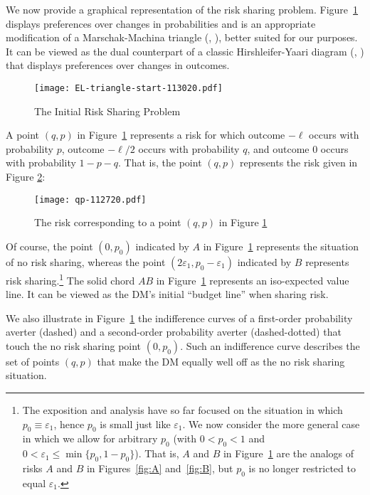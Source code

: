 \documentclass[11pt]{article}
\begin{document}
We now provide a graphical representation of the risk sharing problem. 
Figure~\ref{fig:initial-EL-triangle} displays preferences over changes in probabilities
and is an appropriate modification of a Marschak-Machina triangle (\cite{M50}, \cite{M82}),
better suited for our purposes. 
It can be viewed as the dual counterpart of a classic Hirshleifer-Yaari diagram (\cite{H65,H66}, \cite{Y65,Y69})
that displays preferences over changes in outcomes.
\vskip -0.5cm
\begin{figure}[H]
\begin{center}
\caption{The Initial Risk Sharing Problem
}
\vskip 0.37cm
\texttt{[image: EL-triangle-start-113020.pdf]}
\label{fig:initial-EL-triangle}
\end{center}
\end{figure}
A point $(q,p)$ in Figure~\ref{fig:initial-EL-triangle} represents a risk
for which outcome $-\ell$ occurs with probability $p$,
outcome $-\ell/2$ occurs with probability $q$,
and 
outcome $0$ occurs with probability $1-p-q$.
That is, the point $(q,p)$ represents the risk given in Figure \ref{fig:qp}:
\vskip -0.5cm
\begin{figure}[H]
\begin{center}
\caption{The risk corresponding to a point $(q,p)$ in Figure \ref{fig:initial-EL-triangle}
}
\vskip 0.4cm
\texttt{[image: qp-112720.pdf]}
\label{fig:qp}
\end{center}
\end{figure}
\noindent
Of course, the point $(0,p_{0})$ indicated by $A$ in Figure~\ref{fig:initial-EL-triangle} represents the situation of no risk sharing,
whereas the point $(2\varepsilon_{1},p_{0}-\varepsilon_{1})$ indicated by $B$ represents %
risk sharing.\footnote{The exposition and analysis have so far focused on the situation in which $p_{0}\equiv\varepsilon_{1}$,
hence $p_{0}$ is small just like $\varepsilon_{1}$.
We now consider the more general case in which
we allow for arbitrary $p_{0}$ (with $0<p_{0}<1$ and $0<\varepsilon_{1}\leq \min\{p_{0},1-p_{0}\}$).
That is, $A$ and $B$ in Figure~\ref{fig:initial-EL-triangle} are the analogs of risks $A$ and $B$ in Figures~\ref{fig:A} and~\ref{fig:B},
but $p_{0}$ is no longer restricted to equal $\varepsilon_{1}$.}
The solid chord $AB$ in Figure~\ref{fig:initial-EL-triangle} represents an iso-expected value line. 
It can be viewed as the DM's initial ``budget line'' when sharing risk.

We also illustrate 
in Figure~\ref{fig:initial-EL-triangle}
the indifference curves
of a first-order probability averter (dashed) and a second-order probability averter (dashed-dotted)
that touch the no risk sharing point $(0,p_{0})$.
Such an indifference curve describes the set of points $(q,p)$ that make the DM equally well off as the no risk sharing situation.
\end{document}
